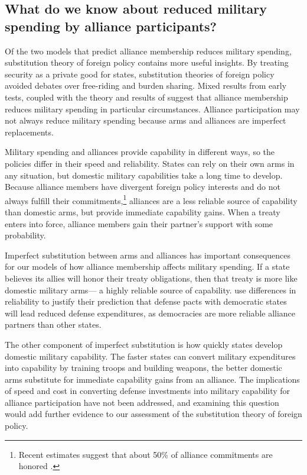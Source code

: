 \documentclass[12pt]{article}
\begin{document}
\subsection{What do we know about reduced military spending by alliance participants?}


Of the two models that predict alliance membership reduces military spending, substitution theory of foreign policy contains more useful insights. 
By treating security as a private good for states, substitution theories of foreign policy avoided debates over free-riding and burden sharing. 
Mixed results from early tests, coupled with the theory and results of \citet{DigiuseppePoast2016} suggest that alliance membership reduces military spending in particular circumstances. 
Alliance participation may not always reduce military spending because arms and alliances are imperfect replacements. 


Military spending and alliances provide capability in different ways, so the policies differ in their speed and reliability.
States can rely on their own arms in any situation, but domestic military capabilities take a long time to develop. 
Because alliance members have divergent foreign policy interests and do not always fulfill their commitments,\footnote{Recent estimates suggest that about 50\% of alliance commitments are honored \citep{BerkemeierFuhrmann2018}.} alliances are a less reliable source of capability than domestic arms, but provide immediate capability gains. 
When a treaty enters into force, alliance members gain their partner’s support with some probability.


Imperfect substitution between arms and alliances has important consequences for our models of how alliance membership affects military spending. 
If a state believes its allies will honor their treaty obligations, then that treaty is more like domestic military arms--- a highly reliable source of capability.
\citet{DigiuseppePoast2016} use differences in reliability to justify their prediction that defense pacts with democratic states will lead reduced defense expenditures, as democracies are more reliable alliance partners than other states.


The other component of imperfect substitution is how quickly states develop domestic military capability.  
The faster states can convert military expenditures into capability by training troops and building weapons, the better domestic arms substitute for immediate capability gains from an alliance. 
The implications of speed and cost in converting defense investments into military capability for alliance participation have not been addressed, and examining this question would add further evidence to our assessment of the substitution theory of foreign policy. 
\end{document}
